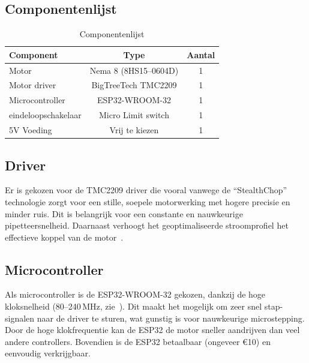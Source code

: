 \subsection{Componentenlijst}
\begin{table}[H]
    \centering
    \caption{Componentenlijst}\label{tab:componentenlijst}
    \begin{minipage}{\linewidth}
        \centering
        \begin{tabular}{|l|c|c|}
            \hline
            \textbf{Component} & \textbf{Type} & \textbf{Aantal} \\
            \hline
            Motor & Nema 8 (8HS15--0604D) & 1 \\
            Motor driver & BigTreeTech TMC2209 & 1 \\
            Microcontroller & ESP32-WROOM-32 & 1 \\
            eindeloopschakelaar & Micro Limit switch & 1 \\
            5V Voeding & Vrij te kiezen\footnotemark & 1 \\
            \hline
        \end{tabular}
    \end{minipage}
\end{table}

\subsection{Driver}
Er is gekozen voor de TMC2209 driver die vooral vanwege de ``StealthChop'' technologie zorgt voor een stille, soepele motorwerking met hogere precisie en minder ruis. Dit is belangrijk voor een constante en nauwkeurige pipetteersnelheid. Daarnaast verhoogt het geoptimaliseerde stroomprofiel het effectieve koppel van de motor\ \cite{RN45}.

\subsection{Microcontroller}
Als microcontroller is de ESP32-WROOM-32 gekozen, dankzij de hoge kloksnelheid (80–240\,MHz, zie\ \cite{RN47}). Dit maakt het mogelijk om zeer snel stap-signalen naar de driver te sturen, wat gunstig is voor nauwkeurige microstepping. Door de hoge klokfrequentie kan de ESP32 de motor sneller aandrijven dan veel andere controllers. Bovendien is de ESP32 betaalbaar (ongeveer €10) en eenvoudig verkrijgbaar.

